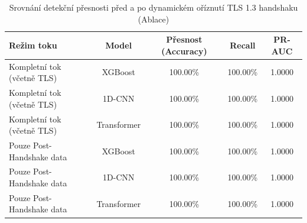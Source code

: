 \begin{table}[htbp]
\centering
\caption{Srovnání detekční přesnosti před a po dynamickém oříznutí TLS 1.3 handshaku (Ablace)}
\label{tab:handshake_comparison}
\begin{tabular}{lcccc}
\hline
\textbf{Režim toku} & \textbf{Model} & \textbf{Přesnost (Accuracy)} & \textbf{Recall} & \textbf{PR-AUC} \\
\hline
Kompletní tok (včetně TLS) & XGBoost & 100.00\% & 100.00\% & 1.0000 \\
Kompletní tok (včetně TLS) & 1D-CNN  & 100.00\% & 100.00\% & 1.0000 \\
Kompletní tok (včetně TLS) & Transformer & 100.00\% & 100.00\% & 1.0000 \\
\hline
Pouze Post-Handshake data & XGBoost & 100.00\% & 100.00\% & 1.0000 \\
Pouze Post-Handshake data & 1D-CNN  & 100.00\% & 100.00\% & 1.0000 \\
Pouze Post-Handshake data & Transformer & 100.00\% & 100.00\% & 1.0000 \\
\hline
\end{tabular}
\end{table}
